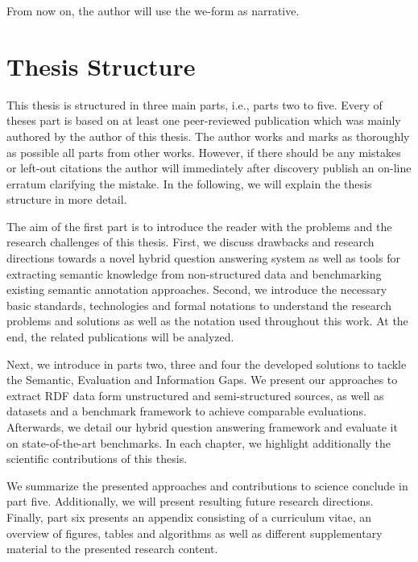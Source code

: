 From now on, the author will use the we-form as narrative.


\section*{Thesis Structure}

This thesis is structured in three main parts, i.e., parts two to five.
Every of theses part is based on at least one peer-reviewed publication which was mainly authored by the author of this thesis.
The author works and marks as thoroughly as possible all parts from other works. 
However, if there should be any mistakes or left-out citations the author will immediately after discovery publish an on-line erratum clarifying the mistake. 
In the following, we will explain the thesis structure in more detail.

The aim of the first part is to introduce the reader with the problems and the research challenges of this thesis. 
First, we discuss drawbacks and research directions towards a novel hybrid question answering system as well as tools for extracting semantic knowledge from non-structured data and benchmarking existing semantic annotation approaches.
Second, we introduce the necessary basic standards, technologies and formal notations to understand the research problems and solutions as well as the notation used throughout this work.
At the end, the related publications will be analyzed.

Next, we introduce in parts two, three and four the developed solutions to tackle the Semantic, Evaluation and Information Gaps. 
We  present our approaches to extract RDF data form unstructured and semi-structured sources, as well as datasets and a benchmark framework to achieve comparable evaluations. 
Afterwards, we detail our hybrid question answering framework and evaluate it on state-of-the-art benchmarks.
In each chapter, we highlight additionally the scientific contributions of this thesis.

We  summarize the presented approaches and contributions to science conclude in part five. 
Additionally, we will present resulting future research directions.
Finally, part six presents an appendix consisting of a curriculum vitae, an overview of figures, tables and algorithms as well as different supplementary material to the presented research content.